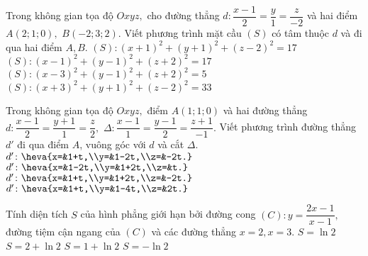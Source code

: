 \begin{ex}%
Trong không gian tọa độ $Oxyz,$ cho đường thẳng $d\colon \dfrac{x-1}{2}=\dfrac{y}1=\dfrac{z}{-2}$ và hai điểm $A(2; 1; 0),$ $ B(-2; 3; 2).$ Viết phương trình mặt cầu $(S)$ có tâm thuộc $d$ và đi qua hai điểm $A, B$.
\choice
{\True $(S)\colon (x+1)^2+(y+1)^2+(z-2)^2=17$}
{$(S)\colon (x-1)^2+(y-1)^2+(z+2)^2=17$}
{$(S)\colon (x-3)^2+(y-1)^2+(z+2)^2=5$}
{$(S)\colon (x+3)^2+(y+1)^2+(z-2)^2=33$}
\end{ex}

\begin{ex}%
Trong không gian tọa độ $Oxyz,$ điểm $A(1; 1; 0)$ và hai đường thẳng $d\colon \dfrac{x-1}{2}=\dfrac{y+1}1=\dfrac{z}{2},$  $\Delta\colon \dfrac{x-1}{1}=\dfrac{y-1}2=\dfrac{z+1}{-1}.$ Viết phương trình đường thẳng $d'$ đi qua điểm $A$, vuông góc với $d$ và cắt $\Delta.$
\def\dotEX{}
\choice
{$d'\colon \heva{x=&1+t,\\y=&1-2t,\\z=&-2t.}$}
{$d'\colon \heva{x=&1-2t,\\y=&1+2t,\\z=&t.}$}
{\True $d'\colon \heva{x=&1+t,\\y=&1+2t,\\z=&-2t.}$}
{$d'\colon \heva{x=&1+t,\\y=&1-4t,\\z=&2t.}$}
\end{ex}

\begin{ex}%
Tính diện tích $S$ của hình phẳng giới hạn bởi đường cong $(C)\colon y=\dfrac{2x-1}{x-1},$ đường tiệm cận ngang của $(C)$ và các đường thẳng $x=2, x=3.$
\choice
{\True $S=\ln 2$}
{$S=2+\ln 2$}
{$S=1+\ln 2$}
{$S=-\ln 2$}
\end{ex}

